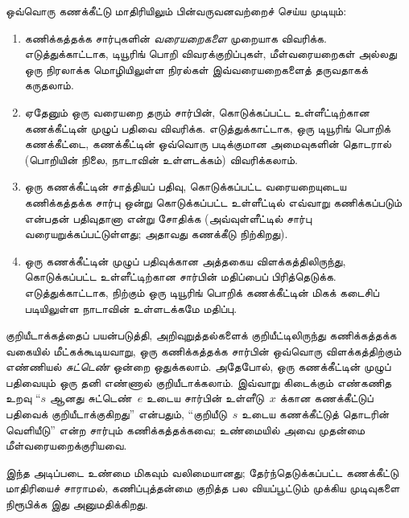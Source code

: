 \documentclass[../../../include/open-logic-section]{subfiles}
\begin{document}


ஒவ்வொரு கணக்கீட்டு மாதிரியிலும் பின்வருவனவற்றைச் செய்ய முடியும்:
\begin{enumerate}
\item கணிக்கத்தக்க சார்புகளின் \emph{வரையறைகளை} முறையாக விவரிக்க.
  எடுத்துக்காட்டாக, டியூரிங் பொறி விவரக்குறிப்புகள், மீள்வரையறைகள்
  அல்லது ஒரு நிரலாக்க மொழியிலுள்ள நிரல்கள் இவ்வரையறைகளைத் தருவதாகக்
  கருதலாம்.
\item ஏதேனும் ஒரு வரையறை தரும் சார்பின், கொடுக்கப்பட்ட உள்ளீட்டிற்கான
  கணக்கீட்டின் முழுப் பதிவை விவரிக்க. எடுத்துக்காட்டாக, ஒரு டியூரிங்
  பொறிக் கணக்கீட்டை, கணக்கீட்டின் ஒவ்வொரு படிக்குமான அமைவுகளின்
  தொடரால் (பொறியின் நிலை, நாடாவின் உள்ளடக்கம்) விவரிக்கலாம்.
\item ஒரு கணக்கீட்டின் சாத்தியப் பதிவு, கொடுக்கப்பட்ட வரையறையுடைய
  கணிக்கத்தக்க சார்பு ஒன்று கொடுக்கப்பட்ட உள்ளீட்டில் எவ்வாறு
  கணிக்கப்படும் என்பதன் பதிவுதானா என்று சோதிக்க (அவ்வுள்ளீட்டில்
  சார்பு வரையறுக்கப்பட்டுள்ளது; அதாவது கணக்கீடு நிற்கிறது).
\item ஒரு கணக்கீட்டின் முழுப் பதிவுக்கான அத்தகைய விளக்கத்திலிருந்து,
  கொடுக்கப்பட்ட உள்ளீட்டிற்கான சார்பின் மதிப்பைப் பிரித்தெடுக்க.
  எடுத்துக்காட்டாக, நிற்கும் ஒரு டியூரிங் பொறிக் கணக்கீட்டின்
  மிகக் கடைசிப் படியிலுள்ள நாடாவின் உள்ளடக்கமே மதிப்பு.
\end{enumerate}

குறியீடாக்கத்தைப் பயன்படுத்தி, அறிவுறுத்தல்களைக் குறியீட்டிலிருந்து
கணிக்கத்தக்க வகையில் மீட்கக்கூடியவாறு, ஒரு கணிக்கத்தக்க சார்பின்
ஒவ்வொரு விளக்கத்திற்கும் எண்ணியல் \emph{சுட்டெண்} ஒன்றை ஒதுக்கலாம்.
அதேபோல், ஒரு கணக்கீட்டின் முழுப் பதிவையும் ஒரு தனி எண்ணால்
குறியீடாக்கலாம். இவ்வாறு கிடைக்கும் எண்கணித உறவு “$s$ ஆனது
சுட்டெண்~$e$ உடைய சார்பின் உள்ளீடு~$x$ க்கான கணக்கீட்டுப் பதிவைக்
குறியீடாக்குகிறது” என்பதும், “குறியீடு~$s$ உடைய கணக்கீட்டுத்
தொடரின் வெளியீடு” என்ற சார்பும் கணிக்கத்தக்கவை; உண்மையில் அவை
முதன்மை மீள்வரையறைக்குரியவை.

இந்த அடிப்படை உண்மை மிகவும் வலிமையானது; தேர்ந்தெடுக்கப்பட்ட
கணக்கீட்டு மாதிரியைச் சாராமல், கணிப்புத்தன்மை குறித்த பல வியப்பூட்டும்
முக்கிய முடிவுகளை நிரூபிக்க இது அனுமதிக்கிறது.
\end{document}
